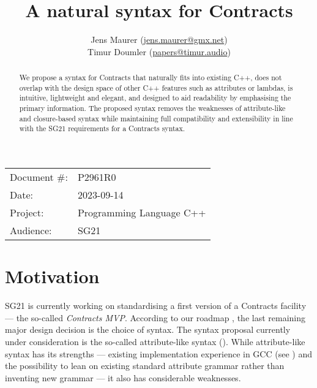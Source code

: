 


\title{A natural syntax for Contracts}
\author{ Jens Maurer \small(\href{mailto:jens.maurer@gmx.net}{jens.maurer@gmx.net}) \\
 Timur Doumler \small(\href{mailto:papers@timur.audio}{papers@timur.audio})}
\date{}
\maketitle

\begin{tabular}{ll}
Document \#: & P2961R0 \\
Date: &2023-09-14 \\
Project: & Programming Language C++ \\
Audience: & SG21
\end{tabular}

\begin{abstract}
We propose a syntax for Contracts that naturally fits into existing C++, does not overlap with the design space of other C++ features such as attributes or lambdas, is intuitive, lightweight and elegant, and designed to aid readability by emphasising the primary information. The proposed syntax removes the weaknesses of attribute-like and closure-based syntax while maintaining full compatibility and extensibility in line with the SG21 requirements for a Contracts syntax.
\end{abstract}

\section{Motivation}
\label{sec:motivation}

SG21 is currently working on standardising a first version of a Contracts facility --- the so-called \emph{Contracts MVP}. According to our roadmap \cite{P2695R1}, the last remaining major design decision is the choice of syntax. The syntax proposal currently under consideration is the so-called attribute-like syntax (\cite{P2935R0}). While attribute-like syntax has its strengths --- existing implementation experience in GCC (see \cite{P1680R0}) and the possibility to lean on existing standard attribute grammar rather than inventing new grammar --- it also has considerable weaknesses.

